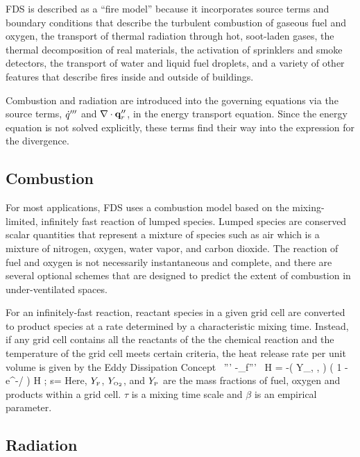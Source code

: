 FDS is described as a ``fire model'' because it incorporates source terms and boundary conditions that describe the
turbulent combustion of gaseous fuel and oxygen, the transport of thermal radiation through hot, soot-laden gases, the
thermal decomposition of real materials, the activation of sprinklers and smoke detectors, the transport of water and liquid fuel
droplets, and a variety of other features that describe fires inside and outside of buildings.

Combustion and radiation are introduced into the governing equations via the source terms, $\dot{q}'''$ and $\nabla \cdot {\bf q}_r''$,
in the energy transport equation. Since the energy equation is not solved explicitly, these terms find their way into the
expression for the divergence.

\subsection{Combustion}

For most applications, FDS uses a combustion model based on the mixing-limited, infinitely fast reaction of lumped species.
Lumped species are conserved scalar quantities that represent a mixture of species such as air which is a mixture of
nitrogen, oxygen, water vapor, and carbon dioxide.  The reaction of fuel and oxygen is not necessarily instantaneous and
complete, and there are
several optional schemes that are designed to predict the extent of combustion in under-ventilated spaces.

For an infinitely-fast reaction, reactant species in a given grid cell are converted to product species at a rate determined by a
characteristic mixing time.
Instead, if any grid cell contains all the reactants of the the chemical reaction and the temperature of the grid cell meets
certain criteria, the heat release rate per unit volume is given by the Eddy Dissipation Concept~\cite{Poinsot:TNC}
\be
   \dq''' \equiv -\dm_f''' \, \Delta H = -\rho \min \left( Y_\F , , \beta {} \right) \;
   \left( 1 - e^{-\dt/\tau} \right)  \; \Delta H \quad ; \quad
   s=  \label{EDC1}
\ee
Here, $Y_{\tiny \hbox{F}}$, $Y_{\tiny \hbox{O}_2}$, and $Y_{\hbox{\tiny P}}$ are the mass fractions of fuel, oxygen and products within a grid cell.
$\tau$ is a mixing time scale and $\beta$ is an empirical parameter.


\subsection{Radiation}


